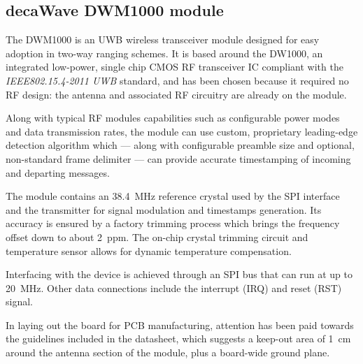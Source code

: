 \subsection{decaWave DWM1000 module}

The DWM1000 is an UWB wireless transceiver module designed for easy adoption in two-way ranging schemes.
It is based around the DW1000, an integrated low-power, single chip CMOS RF transceiver IC compliant with the \emph{IEEE802.15.4-2011 UWB} standard, and has been chosen because it required no RF design: the antenna and associated RF circuitry are already on the module.

Along with typical RF modules capabilities such as configurable power modes and data transmission rates, the module can use custom, proprietary leading-edge detection algorithm which --- along with configurable preamble size and optional, non-standard frame delimiter --- can provide accurate timestamping of incoming and departing messages.

The module contains an \SI{38.4}{\mega\hertz} reference crystal used by the SPI interface and the transmitter for signal modulation and timestamps generation.
Its accuracy is ensured by a factory trimming process which brings the frequency offset down to about \SI{2}{ppm}.
The on-chip crystal trimming circuit and temperature sensor allows for dynamic temperature compensation.

Interfacing with the device is achieved through an SPI bus that can run at up to \SI{20}{\mega\hertz}.
Other data connections include the interrupt (IRQ) and reset (RST) signal.

In laying out the board for PCB manufacturing, attention has been paid towards the guidelines included in the datasheet, which suggests a keep-out area of \SI{1}{\centi\meter} around the antenna section of the module, plus a board-wide ground plane.
